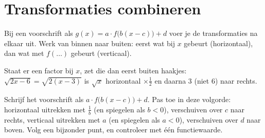 \begin{oefeningen}

\end{oefeningen}

\section{Transformaties combineren}

Bij een voorschrift als $g(x) = a \cdot f\bigl(b(x - c)\bigr) + d$ voer je de transformaties na elkaar uit. Werk van binnen naar buiten: eerst wat bij $x$ gebeurt (horizontaal), dan wat met $f(\ldots)$ gebeurt (verticaal).


Staat er een factor bij $x$, zet die dan eerst buiten haakjes: $\sqrt{2x - 6} = \sqrt{2(x - 3)}$ is $\sqrt{x}$ horizontaal $\times \frac12$ en daarna 3 (niet 6) naar rechts.

\begin{werkwijze}
Schrijf het voorschrift als $a \cdot f\bigl(b(x - c)\bigr) + d$. Pas toe in deze volgorde: horizontaal uitrekken met $\frac1b$ (en spiegelen als $b < 0$), verschuiven over $c$ naar rechts, verticaal uitrekken met $a$ (en spiegelen als $a < 0$), verschuiven over $d$ naar boven. Volg een bijzonder punt, en controleer met één functiewaarde.
\end{werkwijze}


